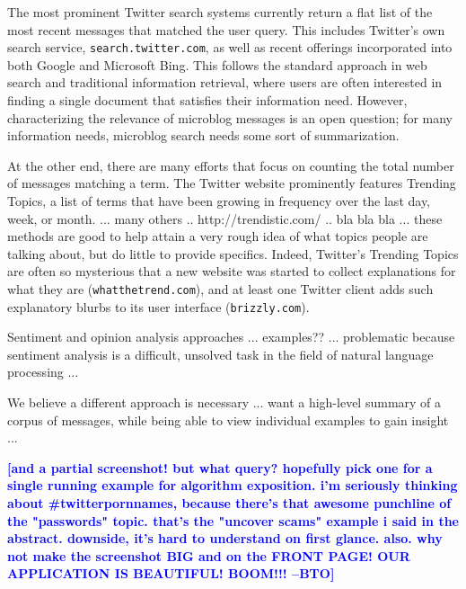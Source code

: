 \documentclass[letterpaper]{article}
\newcommand{\bto}[1]{\textcolor{blue}{\textbf{[#1 --BTO]}}}
\newcommand{\link}[1]{\texttt{\small{#1}}}
\begin{document}
The most prominent Twitter search systems currently return a flat list of the most recent messages that matched the user query.  This includes Twitter's own search service, \link{search.twitter.com}, as well as recent offerings incorporated into both Google and Microsoft Bing.  This follows the standard approach in web search and traditional information retrieval, where users are often interested in finding a single document that satisfies their information need.  However, characterizing the relevance of microblog messages is an open question; for many information needs, microblog search needs some sort of summarization.

At the other end, there are many efforts that focus on counting the total number of messages matching a term.  The Twitter website prominently features Trending Topics, a list of terms that have been growing in frequency over the last day, week, or month.  ... many others  ..   http://trendistic.com/  .. bla bla bla ... these methods are good to help attain a very rough idea of what topics people are talking about, but do little to provide specifics.  Indeed, Twitter's Trending Topics are often so mysterious that a new website was started to collect explanations for what they are (\link{whatthetrend.com}), and at least one Twitter client adds such explanatory blurbs to its user interface (\link{brizzly.com}).

% 




Sentiment and opinion analysis approaches ... examples?? ... problematic because sentiment analysis is a difficult, unsolved task in the field of natural language processing ...

We believe a different approach is necessary ... want a high-level summary of a corpus of messages, while being able to view individual examples to gain insight ...

\bto{and a partial screenshot!  but what query? hopefully pick one for a single running example for algorithm exposition.  i'm seriously thinking about \#twitterpornnames, because there's that awesome punchline of the "passwords" topic.  that's the "uncover scams" example i said in the abstract. downside, it's hard to understand on first glance.  also. why not make the screenshot BIG and on the FRONT PAGE!  OUR APPLICATION IS BEAUTIFUL! BOOM!!!}
\end{document}
